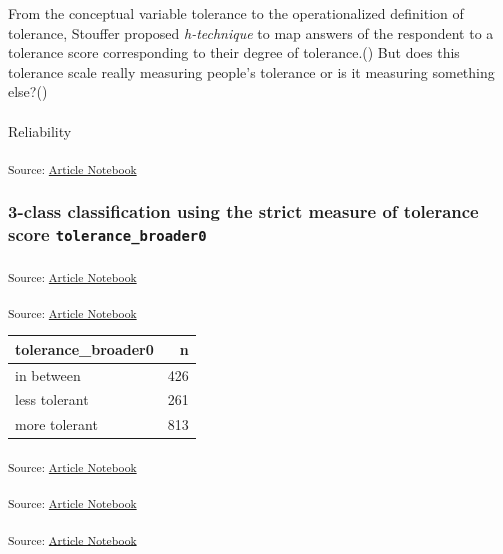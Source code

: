 \documentclass[
  letterpaper,
  DIV=11,
  numbers=noendperiod]{scrartcl}
\makeatletter
\let\oldparagraph\paragraph
\renewcommand{\paragraph}{
    \@ifstar
      \xxxParagraphStar
      \xxxParagraphNoStar
  }
\newcommand{\xxxParagraphStar}[1]{\oldparagraph*{#1}\mbox{}}
\newcommand{\xxxParagraphNoStar}[1]{\oldparagraph{#1}\mbox{}}
\makeatother
\begin{document}
From the conceptual variable tolerance to the operationalized definition
of tolerance, Stouffer proposed \emph{h-technique} to map answers of the
respondent to a tolerance score corresponding to their degree of
tolerance.() But does this tolerance scale really measuring people's
tolerance or is it measuring something
else?()

\paragraph{Reliability}\label{reliability}

\textsubscript{Source:
\href{https://h-christy.github.io/data-ethics-final/index.qmd.html}{Article
Notebook}}

\subsubsection{\texorpdfstring{3-class classification using the strict
measure of tolerance score
\texttt{tolerance\_broader0}}{3-class classification using the strict measure of tolerance score tolerance\_broader0}}\label{class-classification-using-the-strict-measure-of-tolerance-score-tolerance_broader0}

\textsubscript{Source:
\href{https://h-christy.github.io/data-ethics-final/index.qmd.html}{Article
Notebook}}

\textsubscript{Source:
\href{https://h-christy.github.io/data-ethics-final/index.qmd.html}{Article
Notebook}}

\begin{longtable}[]{@{}lr@{}}
\toprule\noalign{}
tolerance\_broader0 & n \\
\midrule\noalign{}
\endhead
\bottomrule\noalign{}
\endlastfoot
in between & 426 \\
less tolerant & 261 \\
more tolerant & 813 \\
\end{longtable}

\textsubscript{Source:
\href{https://h-christy.github.io/data-ethics-final/index.qmd.html}{Article
Notebook}}

\textsubscript{Source:
\href{https://h-christy.github.io/data-ethics-final/index.qmd.html}{Article
Notebook}}

\textsubscript{Source:
\href{https://h-christy.github.io/data-ethics-final/index.qmd.html}{Article
Notebook}}
\end{document}
